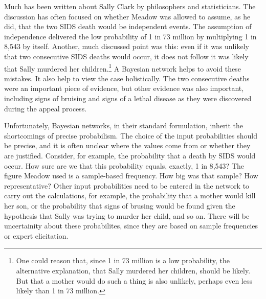 \documentclass[
  letterpaper,
  DIV=11,
  numbers=noendperiod]{scrartcl}
\begin{document}
Much has been written about Sally Clark by philosophers and
statisticians. The discussion has often focused on whether Meadow was
allowed to assume, as he did, that the two SIDS death would be
independent events. The assumption of independence delivered the low
probability of 1 in 73 million by multiplying 1 in 8,543 by itself.
Another, much discussed point was this: even if it was unlikely that two
consecutive SIDS deaths would occur, it does not follow it was likely
that Sally murdered her children.\footnote{One could reason that, since
  1 in 73 million is a low probability, the alternative explanation,
  that Sally murdered her children, should be likely. But that a mother
  would do such a thing is also unlikely, perhaps even less likely than
  1 in 73 million.} A Bayesian network helps to avoid these mistakes. It
also help to view the case holistically. The two consecutive deaths were
an important piece of evidence, but other evidence was also important,
including signs of bruising and signs of a lethal disease as they were
discovered during the appeal process.

Unfortunately, Bayesian networks, in their standard formulation, inherit
the shortcomings of precise probabilism. The choice of the input
probabilities should be precise, and it is often unclear where the
values come from or whether they are justified. Consider, for example,
the probability that a death by SIDS would occur. How sure are we that
this probability equals, exactly, 1 in 8,543? The figure Meadow used is
a sample-based frequency. How big was that sample? How representative?
Other input probabilities need to be entered in the network to carry out
the calculations, for example, the probability that a mother would kill
her son, or the probability that signs of brusing would be found given
the hypothesis that Sally was trying to murder her child, and so on.
There will be uncertainity about these probabilites, since they are
based on sample frequencies or expert elicitation.
\end{document}

